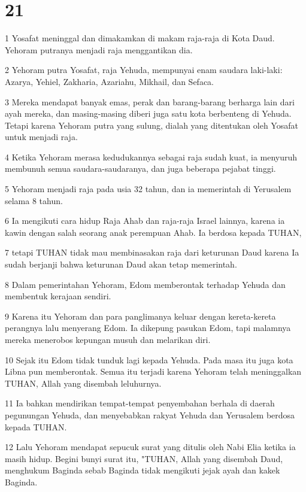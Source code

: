 \chapter{21}

\par 1 Yosafat meninggal dan dimakamkan di makam raja-raja di Kota Daud. Yehoram putranya menjadi raja menggantikan dia.
\par 2 Yehoram putra Yosafat, raja Yehuda, mempunyai enam saudara laki-laki: Azarya, Yehiel, Zakharia, Azariahu, Mikhail, dan Sefaca.
\par 3 Mereka mendapat banyak emas, perak dan barang-barang berharga lain dari ayah mereka, dan masing-masing diberi juga satu kota berbenteng di Yehuda. Tetapi karena Yehoram putra yang sulung, dialah yang ditentukan oleh Yosafat untuk menjadi raja.
\par 4 Ketika Yehoram merasa kedudukannya sebagai raja sudah kuat, ia menyuruh membunuh semua saudara-saudaranya, dan juga beberapa pejabat tinggi.
\par 5 Yehoram menjadi raja pada usia 32 tahun, dan ia memerintah di Yerusalem selama 8 tahun.
\par 6 Ia mengikuti cara hidup Raja Ahab dan raja-raja Israel lainnya, karena ia kawin dengan salah seorang anak perempuan Ahab. Ia berdosa kepada TUHAN,
\par 7 tetapi TUHAN tidak mau membinasakan raja dari keturunan Daud karena Ia sudah berjanji bahwa keturunan Daud akan tetap memerintah.
\par 8 Dalam pemerintahan Yehoram, Edom memberontak terhadap Yehuda dan membentuk kerajaan sendiri.
\par 9 Karena itu Yehoram dan para panglimanya keluar dengan kereta-kereta perangnya lalu menyerang Edom. Ia dikepung pasukan Edom, tapi malamnya mereka menerobos kepungan musuh dan melarikan diri.
\par 10 Sejak itu Edom tidak tunduk lagi kepada Yehuda. Pada masa itu juga kota Libna pun memberontak. Semua itu terjadi karena Yehoram telah meninggalkan TUHAN, Allah yang disembah leluhurnya.
\par 11 Ia bahkan mendirikan tempat-tempat penyembahan berhala di daerah pegunungan Yehuda, dan menyebabkan rakyat Yehuda dan Yerusalem berdosa kepada TUHAN.
\par 12 Lalu Yehoram mendapat sepucuk surat yang ditulis oleh Nabi Elia ketika ia masih hidup. Begini bunyi surat itu, "TUHAN, Allah yang disembah Daud, menghukum Baginda sebab Baginda tidak mengikuti jejak ayah dan kakek Baginda.
